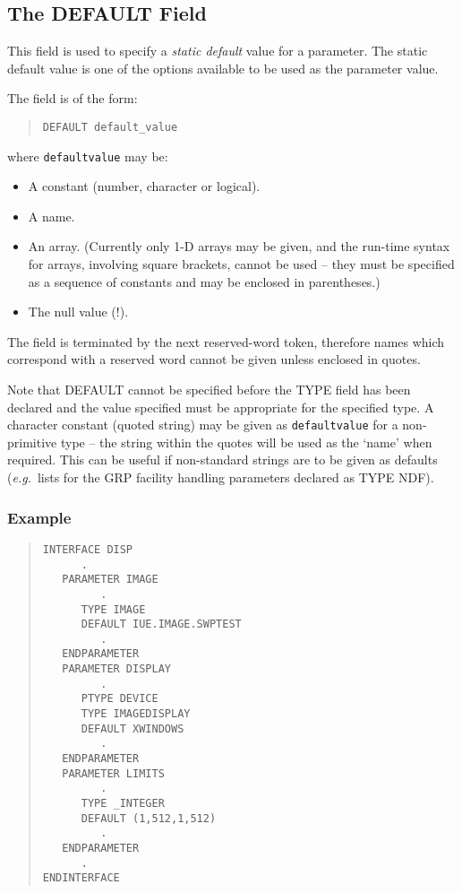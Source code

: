 \documentclass[twoside,11pt]{article}
\newcommand{\xlabel}[1]{}
\renewcommand{\_}{\texttt{\symbol{95}}}
\begin{document}
\subsection{The DEFAULT Field
\xlabel{the_default_field}\label{default}}

This field is used to specify a {\em static default} value for a parameter.
The static default value is one of the options available to be used as the
parameter value.

The field is of the form:
\begin{quote} \begin{verbatim}
DEFAULT default_value
\end{verbatim} \end{quote}
where \texttt{default\_value} may be:
\begin{itemize}
\item A constant (number, character or logical).
\item A name.
\item An array. (Currently only 1-D arrays may be given, and the run-time
syntax for arrays, involving square brackets, cannot be used -- they must be
specified as a sequence of constants and may be enclosed in parentheses.)
\item The null value (!).
\end{itemize}
The field is terminated by the next reserved-word token, therefore names which
correspond with a reserved word cannot be given unless enclosed in quotes.

Note that DEFAULT cannot be specified before the TYPE field has been declared
and the value specified must be appropriate for the specified type.
A character constant (quoted string) may be given as \texttt{default\_value}
for a non-primitive type -- the string within the quotes will be used as the
`name' when required. This can be useful if non-standard strings are to be
given as defaults ({\em e.g.}\ lists for the GRP facility handling parameters
declared as TYPE NDF).

\subsubsection*{Example}
\begin{quote} \begin{verbatim}
INTERFACE DISP
      .
   PARAMETER IMAGE
         .
      TYPE IMAGE
      DEFAULT IUE.IMAGE.SWPTEST
         .
   ENDPARAMETER
   PARAMETER DISPLAY
         .
      PTYPE DEVICE
      TYPE IMAGEDISPLAY
      DEFAULT XWINDOWS
         .
   ENDPARAMETER
   PARAMETER LIMITS
         .
      TYPE _INTEGER
      DEFAULT (1,512,1,512)
         .
   ENDPARAMETER
      .
ENDINTERFACE
\end{verbatim} \end{quote}
\end{document}
